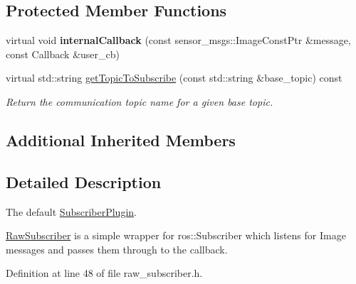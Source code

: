 \subsection*{Protected Member Functions}
\begin{DoxyCompactItemize}
\item 
\hypertarget{classimage__transport_1_1_raw_subscriber_a66df34f75b6dbab383de759bb0fa60b2}{virtual void {\bfseries internal\-Callback} (const sensor\-\_\-msgs\-::\-Image\-Const\-Ptr \&message, const Callback \&user\-\_\-cb)}\label{classimage__transport_1_1_raw_subscriber_a66df34f75b6dbab383de759bb0fa60b2}

\item 
virtual std\-::string \hyperlink{classimage__transport_1_1_raw_subscriber_a6da2134193b87fb71afda535a618cc7c}{get\-Topic\-To\-Subscribe} (const std\-::string \&base\-\_\-topic) const 
\begin{DoxyCompactList}\small\item\em Return the communication topic name for a given base topic. \end{DoxyCompactList}\end{DoxyCompactItemize}
\subsection*{Additional Inherited Members}


\subsection{Detailed Description}
The default \hyperlink{classimage__transport_1_1_subscriber_plugin}{Subscriber\-Plugin}. 

\hyperlink{classimage__transport_1_1_raw_subscriber}{Raw\-Subscriber} is a simple wrapper for ros\-::\-Subscriber which listens for Image messages and passes them through to the callback. 

Definition at line 48 of file raw\-\_\-subscriber.\-h.



